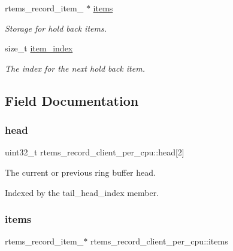 \begin{DoxyCompactItemize}
rtems\+\_\+record\+\_\+item\+\_ $\ast$ \mbox{\hyperlink{structrtems__record__client__per__cpu_a2f547baeca362e27980a9251c86f1bdd}{items}}
\begin{DoxyCompactList}\small\item\em Storage for hold back items. \end{DoxyCompactList}\item 
\mbox{\label{structrtems__record__client__per__cpu_a96c619dc2d0440f03b510a63dc0529df}} 
size\+\_\+t \mbox{\hyperlink{structrtems__record__client__per__cpu_a96c619dc2d0440f03b510a63dc0529df}{item\+\_\+index}}
\begin{DoxyCompactList}\small\item\em The index for the next hold back item. \end{DoxyCompactList}\end{DoxyCompactItemize}


\subsection{Field Documentation}
\mbox{\label{structrtems__record__client__per__cpu_a52b2ef1058a1fa5e5cd0a0be6f955e4a}} 
\subsubsection{\texorpdfstring{head}{head}}
{\footnotesize\ttfamily uint32\+\_\+t rtems\+\_\+record\+\_\+client\+\_\+per\+\_\+cpu\+::head\mbox{[}2\mbox{]}}



The current or previous ring buffer head. 

Indexed by the tail\+\_\+head\+\_\+index member. \mbox{\label{structrtems__record__client__per__cpu_a2f547baeca362e27980a9251c86f1bdd}} 
\subsubsection{\texorpdfstring{items}{items}}
{\footnotesize\ttfamily rtems\+\_\+record\+\_\+item\+\_$\ast$ rtems\+\_\+record\+\_\+client\+\_\+per\+\_\+cpu\+::items}



